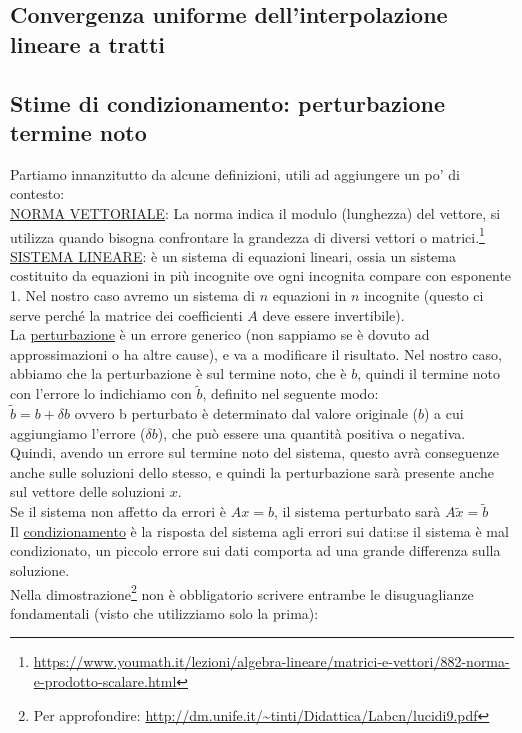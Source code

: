 \subsection{Convergenza uniforme dell'interpolazione lineare a tratti}

\subsection{Stime di condizionamento: perturbazione termine noto} 
Partiamo innanzitutto da alcune definizioni, utili ad aggiungere un po' di contesto:\\
\underline{NORMA VETTORIALE}: La norma indica il modulo (lunghezza) del vettore, si utilizza quando bisogna confrontare la grandezza di diversi vettori o matrici.\footnote[3]{\url{https://www.youmath.it/lezioni/algebra-lineare/matrici-e-vettori/882-norma-e-prodotto-scalare.html}}\\
\underline{SISTEMA LINEARE}: è un sistema di equazioni lineari, ossia un sistema costituito da equazioni in più incognite ove ogni incognita compare con esponente 1. Nel nostro caso avremo un sistema di $n$ equazioni in $n$ incognite (questo ci serve perché la matrice dei coefficienti $A$ deve essere invertibile).\\
La \underline{perturbazione} è un errore generico (non sappiamo se è dovuto ad approssimazioni o ha altre cause), e va a modificare il risultato. Nel nostro caso, abbiamo che la perturbazione è sul termine noto, che è $b$, quindi il termine noto con l'errore lo indichiamo con $\tilde{b}$, definito nel seguente modo:\\
$\tilde{b}=b+\delta b$ ovvero b perturbato è determinato dal valore originale ($b$) a cui aggiungiamo l'errore ($\delta b$), che può essere una quantità positiva o negativa.\\
Quindi, avendo un errore sul termine noto del sistema, questo avrà conseguenze anche sulle soluzioni dello stesso, e quindi la perturbazione sarà presente anche sul vettore delle soluzioni $x$.\\
Se il sistema non affetto da errori è $Ax=b$, il sistema perturbato sarà $A\tilde{x}=\tilde{b}$\\
Il \underline{condizionamento} è la risposta del sistema agli errori sui dati:se il sistema è mal condizionato, un piccolo errore sui dati comporta ad una grande differenza sulla soluzione.\\
Nella dimostrazione\footnote[4]{Per approfondire: \url{http://dm.unife.it/~tinti/Didattica/Labcn/lucidi9.pdf}} non è obbligatorio scrivere entrambe le disuguaglianze fondamentali (visto che utilizziamo solo la prima):\\
